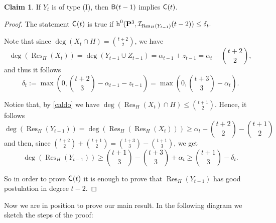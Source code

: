 \documentclass{amsart}
\theoremstyle{plain}
\theoremstyle{definition}
\newtheorem{claim}[theorem]{Claim}
\begin{document}
\begin{claim}\label{claim-e}
If $Y_t$ is of type (I), then ${\sf{B}}(t-1)$ implies ${\sf{C}}(t)$.
\end{claim}

\begin{proof}
The statement ${\sf{C}}(t)$ is true if 
$\operatorname{h}^0({\bf {P}}^3,\mathcal {I}_{\operatorname{Res}_H(Y_{t-1})}(t-2)) \le \delta_t.$

Note that since $\deg(X_t\cap H)=\binom{t+2}{2}$, we have
$$ 
\deg(\operatorname{Res}_H(X_t))=\deg(Y_{t-1}\cup Z_{t-1})=\alpha_{t-1}+z_{t-1} =
\alpha_t - \binom{t+2}{2},
$$
and thus it follows
$$\delta_t:=\max\left(0,\binom{t+2}{3} -\alpha_{t-1}-z_{t-1} \right)=
\max\left(0,\binom{t+3}{3} -\alpha_{t}\right).$$

Notice that, by \eqref{caldo} we have $\deg(\operatorname{Res}_H(X_{t})\cap H) \le \binom{t+1}{2}$.
Hence, it follows
$$\deg(\operatorname{Res}_H(Y_{t-1}))=\deg(\operatorname{Res}_H(\operatorname{Res}_H(X_{t})))\ge
\alpha_{t}- \binom{t+2}{2}-\binom{t+1}{2}$$
and then, since $\binom{t+2}{2}+\binom{t+1}{2}=\binom{t+3}{3}-\binom{t+1}{3}$, we get
$$ \deg(\operatorname{Res}_H(Y_{t-1}))\ge
\binom{t+1}{3}-\binom{t+3}{3}+\alpha_t \ge \binom{t+1}{3}-\delta_t.$$

So in order to prove ${\sf{C}}(t)$ it is enough to prove that
$\operatorname{Res}_H(Y_{t-1})$ has good postulation in degree $t-2$.
\end{proof}

Now we are in position to prove our main result.
In the following diagram we sketch the steps of the proof:
\end{document}

